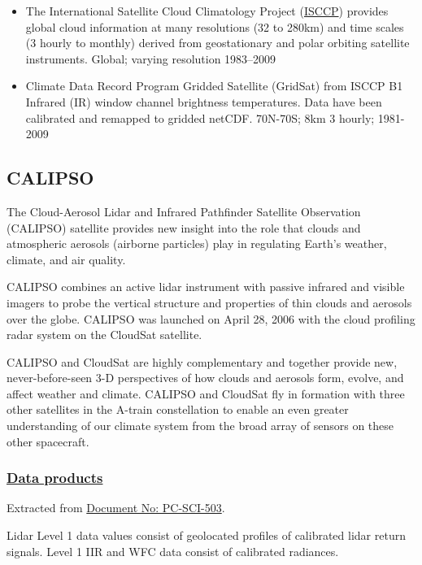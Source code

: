 \documentclass[11pt]{article}
\begin{document}
\begin{itemize}
\item The International Satellite Cloud Climatology
Project (\href{http://isccp.giss.nasa.gov/}{ISCCP}) provides global cloud information at many
resolutions (32 to 280km) and time scales (3 hourly to monthly)
derived from geostationary and polar orbiting satellite
instruments.  Global; varying resolution 1983–2009

\item Climate Data Record Program Gridded Satellite (GridSat) from
ISCCP B1 Infrared (IR) window channel brightness
temperatures. Data have been calibrated and remapped to gridded
netCDF.  70N-70S; 8km 3 hourly; 1981-2009
\end{itemize}

\subsection{CALIPSO}
\label{sec-1-5}

The Cloud-Aerosol Lidar and Infrared Pathfinder Satellite
Observation (CALIPSO) satellite provides new insight into the role
that clouds and atmospheric aerosols (airborne particles) play in
regulating Earth's weather, climate, and air quality.

CALIPSO combines an active lidar instrument with passive infrared
and visible imagers to probe the vertical structure and properties
of thin clouds and aerosols over the globe. CALIPSO was launched
on April 28, 2006 with the cloud profiling radar system on the
CloudSat satellite.

CALIPSO and CloudSat are highly complementary and together provide
new, never-before-seen 3-D perspectives of how clouds and aerosols
form, evolve, and affect weather and climate. CALIPSO and CloudSat
fly in formation with three other satellites in the A-train
constellation to enable an even greater understanding of our
climate system from the broad array of sensors on these other
spacecraft.

\subsubsection{\href{http://eosweb.larc.nasa.gov/PRODOCS/calipso/table_calipso.html}{Data products}}
\label{sec-1-5-1}

Extracted from \href{http://www-calipso.larc.nasa.gov/products/CALIPSO_DPC_Rev3x5.pdf}{Document No: PC-SCI-503}.

Lidar Level 1 data values consist of geolocated profiles of
calibrated lidar return signals. Level 1 IIR and WFC data consist
of calibrated radiances. 
\end{document}
